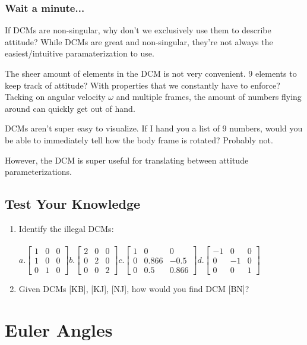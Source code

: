 \documentclass[a4paper,14pt]{extreport}
\begin{document}
\subsection{Wait a minute...}
If DCMs are non-singular, why don't we exclusively use them to describe attitude? While DCMs are great and non-singular, they're not always the easiest/intuitive paramaterization to use. 


The sheer amount of elements in the DCM is not very convenient. 9 elements to keep track of attitude? With properties that we constantly have to enforce? Tacking on angular velocity $\omega$ and multiple frames, the amount of numbers flying around can quickly get out of hand.

DCMs aren't super easy to visualize. If I hand you a list of 9 numbers, would you be able to immediately tell how the body frame is rotated? Probably not.

However, the DCM is super useful for translating between attitude parameterizations.

\section{Test Your Knowledge}
\begin{enumerate}
\item Identify the illegal DCMs:\\\\
	$
	a.
	\begin{bmatrix}
			1&0&0\\
			1&0&0\\
			0&1&0
	\end{bmatrix} 
	b.	
	\begin{bmatrix}
			2&0&0\\
			0&2&0\\
			0&0&2
	\end{bmatrix}
	c.	
	\begin{bmatrix}
			1&0&0\\
			0&0.866&-0.5\\
			0&0.5&0.866
	\end{bmatrix}
	d.
	\begin{bmatrix}
			-1&0&0\\
			0&-1&0\\
			0&0&1
	\end{bmatrix}$ 
\item{Given DCMs [KB], [KJ], [NJ], how would you find DCM [BN]?}
\end{enumerate}

\chapter{Euler Angles}
\end{document}

